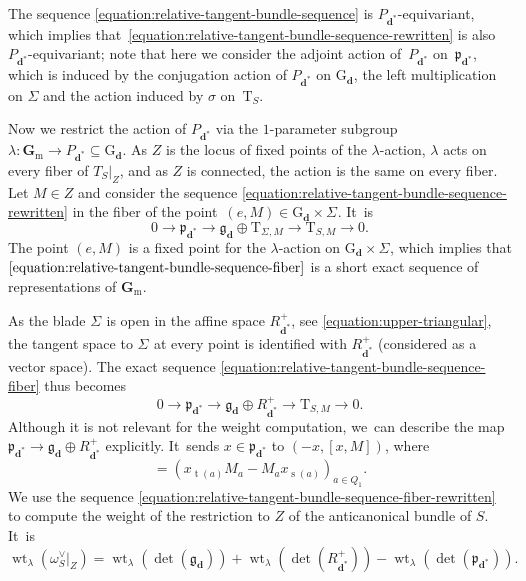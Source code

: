 \documentclass[11pt]{article}
\theoremstyle{plain}
\theoremstyle{definition}
\DeclareMathOperator\source{s}
\DeclareMathOperator\target{t}
\DeclareMathOperator\weight{wt}
\newcommand\blade[1][]{\Sigma_{#1}}
\newcommand\Gm{\ensuremath{\mathbf{G}_{\mathrm{m}}}}
\newcommand\group[1][\tuple{d}]{\mathrm{G}_{#1}}
\newcommand\tangent{\ensuremath{\mathrm{T}}}
\newcommand\tuple[1]{\ensuremath{{\boldsymbol{#1}}}}
\begin{document}
The sequence \eqref{equation:relative-tangent-bundle-sequence}
is $P_{\tuple{d}^*}$-equivariant, which implies that~\eqref{equation:relative-tangent-bundle-sequence-rewritten} is also $P_{\tuple{d}^*}$\nobreakdash-equi\-variant;
note that here we consider the adjoint action of~$P_{\tuple{d}^*}$ on~$\mathfrak{p}_{\tuple{d}^*}$, which is induced by the conjugation action of $P_{\tuple{d}^*}$ on $\group$, the left multiplication on $\Sigma$ and the action induced by $\sigma$ on~$\tangent_{S}$.

Now we restrict the action of $P_{\tuple{d}^*}$ via the $1$-parameter subgroup $\lambda\colon \Gm\!\to\! P_{\tuple{d}^*} \!\subseteq\! \group$.
As $Z$ is the locus of fixed points of the $\lambda$-action,
$\lambda$ acts on every fiber of $T_S|_Z$,
and as $Z$ is connected, the action is the same on every fiber.
Let $M \in Z$ and consider the sequence \eqref{equation:relative-tangent-bundle-sequence-rewritten}
in the fiber of the point~$(e,M) \in \group \times \blade$. It~is
\begin{equation}
\label{equation:relative-tangent-bundle-sequence-fiber}
0
\to\mathfrak{p}_{\tuple{d}^*}
\to\mathfrak{g}_{\tuple{d}} \oplus \tangent_{\blade,M}
\to\tangent_{S,M}
\to0.
\end{equation}
The point $(e,M)$ is a fixed point for the $\lambda$-action on $\group \times \blade$,
which implies that $\eqref{equation:relative-tangent-bundle-sequence-fiber}$ is a short exact sequence of representations of $\Gm$.

As the blade $\blade$ is open in the affine space $R_{\tuple{d}^*}^+$, see \eqref{equation:upper-triangular},
the tangent space to $\blade$ at every point is identified
with $R_{\tuple{d}^*}^+$ (considered as a vector space).
The exact sequence \eqref{equation:relative-tangent-bundle-sequence-fiber} thus becomes
\begin{equation}
\label{equation:relative-tangent-bundle-sequence-fiber-rewritten}
0
\to\mathfrak{p}_{\tuple{d}^*}
\to\mathfrak{g}_{\tuple{d}} \oplus R_{\tuple{d}^*}^+
\to\tangent_{S,M}
\to0.
\end{equation}
Although it is not relevant for the weight computation, we~can describe the map $\mathfrak{p}_{\tuple{d}^*} \to \mathfrak{g}_{\tuple{d}} \oplus R_{\tuple{d}^*}^+$ explicitly. It~sends $x \in \mathfrak{p}_{\tuple{d}^*}$ to $(-x, [x,M])$, where
\begin{equation*}
[x,M] = (x_{\target(a)}M_a - M_ax_{\source(a)})_{a \in Q_1}.
\end{equation*}
We use the sequence \eqref{equation:relative-tangent-bundle-sequence-fiber-rewritten}
to compute the weight of the restriction to $Z$ of the anticanonical bundle of $S$. It~is
\begin{equation}
\label{equation:split-computation}
\weight_{\lambda}(\omega_S^\vee|_Z) = \weight_{\lambda}(\det(\mathfrak{g}_{\tuple{d}})) + \weight_{\lambda}(\det(R_{\tuple{d}^*}^+)) - \weight_{\lambda}(\det(\mathfrak{p}_{\tuple{d}^*})).
\end{equation}
\end{document}

